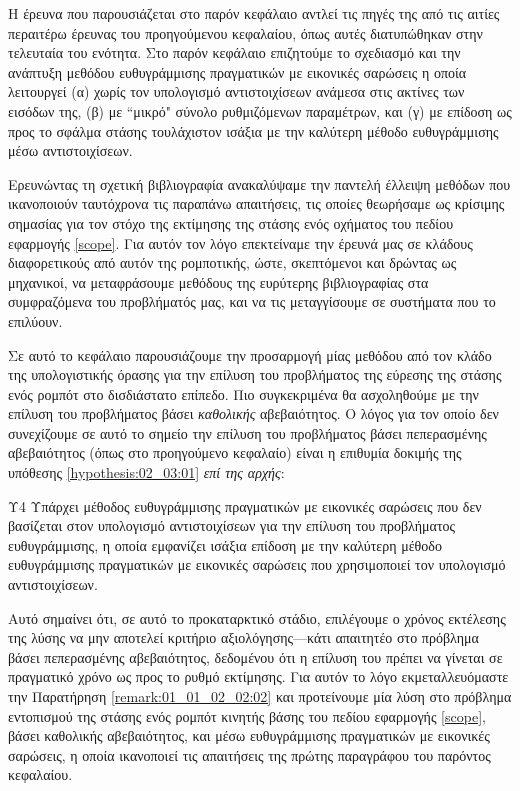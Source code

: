Η έρευνα που παρουσιάζεται στο παρόν κεφάλαιο αντλεί τις πηγές της από τις
αιτίες περαιτέρω έρευνας του προηγούμενου κεφαλαίου, όπως αυτές διατυπώθηκαν
στην τελευταία του ενότητα. Στο παρόν κεφάλαιο επιζητούμε το σχεδιασμό και
την ανάπτυξη μεθόδου ευθυγράμμισης πραγματικών με εικονικές σαρώσεις η οποία
λειτουργεί (α) χωρίς τον υπολογισμό αντιστοιχίσεων ανάμεσα στις ακτίνες των
εισόδων της, (β) με ``μικρό" σύνολο ρυθμιζόμενων παραμέτρων, και (γ) με
επίδοση ως προς το σφάλμα στάσης τουλάχιστον ισάξια με την καλύτερη μέθοδο
ευθυγράμμισης μέσω αντιστοιχίσεων.

Ερευνώντας τη σχετική βιβλιογραφία ανακαλύψαμε την παντελή έλλειψη μεθόδων που
ικανοποιούν ταυτόχρονα τις παραπάνω απαιτήσεις, τις οποίες θεωρήσαμε ως
κρίσιμης σημασίας για τον στόχο της εκτίμησης της στάσης ενός οχήματος του
πεδίου εφαρμογής \ref{scope}. Για αυτόν τον λόγο επεκτείναμε την έρευνά μας σε
κλάδους διαφορετικούς από αυτόν της ρομποτικής, ώστε, σκεπτόμενοι και δρώντας
ως μηχανικοί, να μεταφράσουμε μεθόδους της ευρύτερης βιβλιογραφίας στα
συμφραζόμενα του προβλήματός μας, και να τις μεταγγίσουμε σε συστήματα που το
επιλύουν.

Σε αυτό το κεφάλαιο παρουσιάζουμε την προσαρμογή μίας μεθόδου από τον κλάδο της
υπολογιστικής όρασης για την επίλυση του προβλήματος της εύρεσης της στάσης
ενός ρομπότ στο δισδιάστατο επίπεδο. Πιο συγκεκριμένα θα ασχοληθούμε με την
επίλυση του προβλήματος βάσει \textit{καθολικής} αβεβαιότητος. Ο λόγος για τον
οποίο δεν συνεχίζουμε σε αυτό το σημείο την επίλυση του προβλήματος βάσει
πεπερασμένης αβεβαιότητος (όπως στο προηγούμενο κεφαλαίο) είναι η επιθυμία
δοκιμής της υπόθεσης \ref{hypothesis:02_03:01} \textit{επί της αρχής}:

\begin{customhypothesis}{Υ4}
\label{hypothesis:02_03:01}
  Υπάρχει μέθοδος ευθυγράμμισης πραγματικών με εικονικές σαρώσεις που δεν
  βασίζεται στον υπολογισμό αντιστοιχίσεων για την επίλυση του προβλήματος
  ευθυγράμμισης, η οποία εμφανίζει ισάξια επίδοση με την καλύτερη μέθοδο
  ευθυγράμμισης πραγματικών με εικονικές σαρώσεις που χρησιμοποιεί τον
  υπολογισμό αντιστοιχίσεων.
\end{customhypothesis}

Αυτό σημαίνει ότι, σε αυτό το προκαταρκτικό στάδιο, επιλέγουμε ο χρόνος
εκτέλεσης της λύσης να μην αποτελεί κριτήριο αξιολόγησης---κάτι απαιτητέο στο
πρόβλημα βάσει πεπερασμένης αβεβαιότητος, δεδομένου ότι η επίλυση του πρέπει να
γίνεται σε πραγματικό χρόνο ως προς το ρυθμό εκτίμησης. Για αυτόν το λόγο
εκμεταλλευόμαστε την Παρατήρηση \ref{remark:01_01_02_02:02} και προτείνουμε μία
λύση στο πρόβλημα εντοπισμού της στάσης ενός ρομπότ κινητής βάσης του πεδίου
εφαρμογής \ref{scope}, βάσει καθολικής αβεβαιότητος, και μέσω ευθυγράμμισης
πραγματικών με εικονικές σαρώσεις, η οποία ικανοποιεί τις απαιτήσεις της πρώτης
παραγράφου του παρόντος κεφαλαίου.

